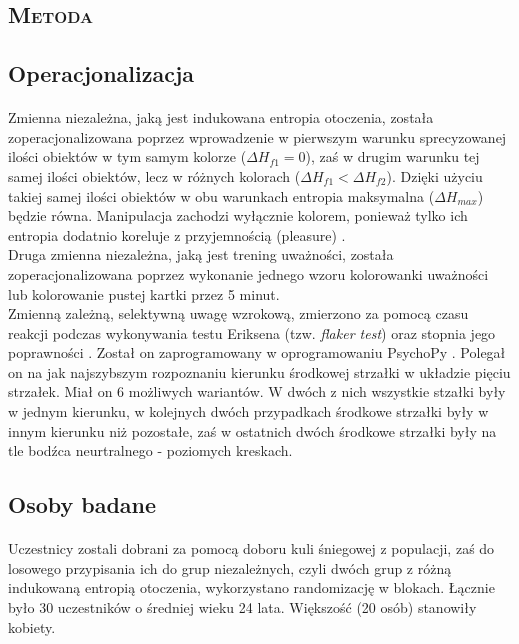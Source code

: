 \documentclass[12pt,a4paper,final,oneside,onecolumn,titlepage]{article}
\begin{document}
\begin{center}
\section*{\large{\textbf{\textsc{Metoda}}}}
\end{center}
\subsection*{\normalsize{\textbf{Operacjonalizacja}}}
\paragraph{}
Zmienna niezależna, jaką jest indukowana entropia otoczenia, została zoperacjonalizowana poprzez wprowadzenie w pierwszym warunku sprecyzowanej ilości obiektów w tym samym kolorze ($\Delta H_{f1}=0$), zaś w drugim warunku tej samej ilości obiektów, lecz w różnych kolorach ($\Delta H_{f1}<\Delta H_{f2}$). Dzięki użyciu takiej samej ilości obiektów w obu warunkach entropia maksymalna ($\Delta H_{max}$) będzie równa. Manipulacja zachodzi wyłącznie kolorem, ponieważ tylko ich entropia dodatnio koreluje z przyjemnością (pleasure) \citep{stamps_entropy_2004, stamps_entropy_2002}.\\
Druga zmienna niezależna, jaką jest trening uważności, została zoperacjonalizowana poprzez wykonanie jednego wzoru kolorowanki uważności lub kolorowanie pustej kartki przez 5 minut.\\
Zmienną zależną, selektywną uwagę wzrokową, zmierzono za pomocą czasu reakcji podczas wykonywania testu Eriksena (tzw. \textit{flaker test}) oraz stopnia jego poprawności \citep{sanders_eriksen_2002}. Został on zaprogramowany w oprogramowaniu PsychoPy \citep{peirce_psychopy2_2019}. Polegał on na jak najszybszym rozpoznaniu kierunku środkowej strzałki w układzie pięciu strzałek. Miał on 6 możliwych wariantów. W dwóch z nich wszystkie stzałki były w jednym kierunku, w kolejnych dwóch przypadkach środkowe strzałki były w innym kierunku niż pozostałe, zaś w ostatnich dwóch środkowe strzałki były na tle bodźca neurtralnego - poziomych kreskach.
\subsection*{\normalsize{\textbf{Osoby badane}}}
\paragraph{}
Uczestnicy zostali dobrani za pomocą doboru kuli śniegowej z populacji, zaś do losowego przypisania ich do grup niezależnych, czyli dwóch grup z różną indukowaną entropią otoczenia, wykorzystano randomizację w blokach. Łącznie było 30 uczestników o średniej wieku 24 lata. Większość (20 osób) stanowiły kobiety.
\end{document}
